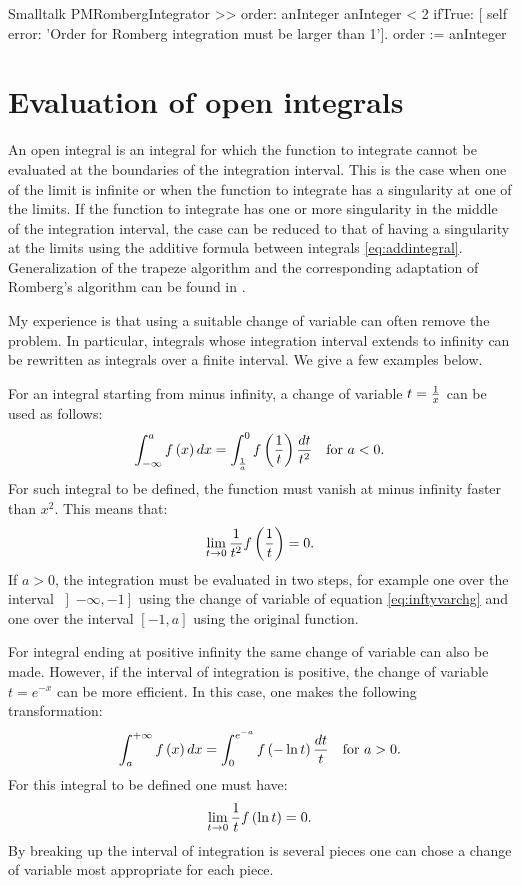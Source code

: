 \begin{displaycode}{Smalltalk}
PMRombergIntegrator >> order: anInteger
    anInteger < 2
        ifTrue: [
           self error: 'Order for Romberg integration must be 
                                                larger than 1'].
    order := anInteger
\end{displaycode}

\section{Evaluation of open integrals}
An open integral is an integral for which the function to
integrate cannot be evaluated at the boundaries of the integration
interval. This is the case when one of the limit is infinite or
when the function to integrate has a singularity at one of the
limits. If the function to integrate has one or more singularity
in the middle of the integration interval, the case can be reduced
to that of having a singularity at the limits using the additive
formula between integrals \ref{eq:addintegral}. Generalization of
the trapeze algorithm and the corresponding adaptation of
Romberg's algorithm can be found in \cite{Press}.

 My experience is that using a suitable
change of variable can often remove the problem. In particular,
integrals whose integration interval extends to infinity can be
rewritten as integrals over a finite interval. We give a few
examples below.

For an integral starting from minus infinity, a change of variable
$t={1 \over x}$ can be used as follows:
\begin{equation}
\label{eq:inftyvarchg}
  \int_{-\infty}^a f\left(x\right)dx= \int_{1\over a}^0 f\left({1\over
  t}\right){dt\over t^2}\mbox{\quad for $a<0$.}
\end{equation}
For such integral to be defined, the function must vanish at minus
infinity faster than $x^2$. This means that:
\begin{equation}
  \lim_{t \to 0}{1\over t^2}f\left({1\over
  t}\right)=0.
\end{equation}
If $a>0$, the integration must be evaluated in two steps, for
example one over the interval $\left]-\infty,-1\right]$ using the
change of variable of equation \ref{eq:inftyvarchg} and one over
the interval $\left[-1,a\right]$ using the original function.

For integral ending at positive infinity the same change of
variable can also be made. However, if the interval of integration
is positive, the change of variable $t=e^{-x}$ can be more
efficient. In this case, one makes the following transformation:
\begin{equation}
\int_a^{+\infty} f\left(x\right)dx=\int_0^{e^{-a}}f\left(-\ln t
\right){dt \over t}\mbox{\quad for $a>0$}.
\end{equation}
For this integral to be defined one must have:
\begin{equation}
  \lim_{t \to 0}{1\over t}f\left(\ln
  t\right)=0.
\end{equation}
By breaking up the interval of integration is several pieces one
can chose a change of variable most appropriate for each piece.


